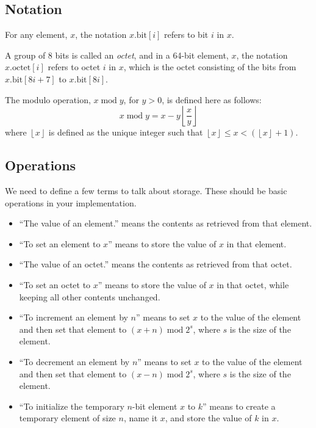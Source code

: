 \documentclass[a4paper,12pt]{article}
\newcommand{\octno}[2]{#1.\mathrm{octet}[#2]}
\newcommand{\bitno}[2]{#1.\mathrm{bit}[#2]}
\DeclareMathOperator{\MOD}{mod}
\newcommand{\modulo}[2]{#1 \MOD #2}
\begin{document}
\subsection{Notation}

For any element, $x$, the notation $\bitno{x}{i}$ refers to bit $i$ in $x$.

A group of 8 bits is called an \emph{octet}, and in a 64-bit element, $x$, the notation $\octno{x}{i}$ refers to octet $i$ in $x$, which is the octet consisting of the bits from $\bitno{x}{8i+7}$ to $\bitno{x}{8i}$.

The modulo operation, $\modulo{x}{y}$, for $y>0$, is defined here as follows:
\[ \modulo{x}{y} = x - y \left \lfloor \frac{x}{y} \right \rfloor \]
where $\left \lfloor x \right \rfloor$ is defined as the unique integer such that $\left \lfloor x \right \rfloor \le x < (\left \lfloor x \right \rfloor + 1)$.
    
\subsection{Operations}
\label{sec:storage-operations}

We need to define a few terms to talk about storage.
These should be basic operations in your implementation.
\begin{itemize}
\item ``The value of an element.'' means the contents as retrieved from that element.
\item ``To set an element to $x$'' means to store the value of $x$ in that element.
\item ``The value of an octet.'' means the contents as retrieved from that octet.
\item ``To set an octet to $x$'' means to store the value of $x$ in that octet, while keeping all other contents unchanged.
\item ``To increment an element by $n$'' means to set $x$ to the value of the element and then set that element to $\modulo{(x + n)}{2^s}$, where $s$ is the size of the element.
\item ``To decrement an element by $n$'' means to set $x$ to the value of the element and then set that element to $\modulo{(x - n)}{2^s}$, where $s$ is the size of the element.
\item  ``To initialize the temporary $n$-bit element $x$ to $k$'' means to create a temporary element of size $n$, name it $x$, and store the value of $k$ in $x$.
\end{itemize}
\end{document}
